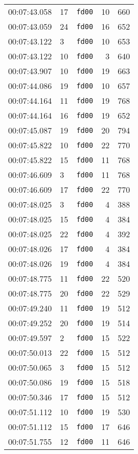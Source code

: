 \documentclass{article}
\begin{document}
\begin{longtable}{lllrr}
00:07:43.058 & 17 & \texttt{fd00} & 10 & 660 \\
00:07:43.059 & 24 & \texttt{fd00} & 16 & 652 \\
00:07:43.122 & 3 & \texttt{fd00} & 10 & 653 \\
00:07:43.122 & 10 & \texttt{fd00} & 3 & 640 \\
00:07:43.907 & 10 & \texttt{fd00} & 19 & 663 \\
00:07:44.086 & 19 & \texttt{fd00} & 10 & 657 \\
00:07:44.164 & 11 & \texttt{fd00} & 19 & 768 \\
00:07:44.164 & 16 & \texttt{fd00} & 19 & 652 \\
00:07:45.087 & 19 & \texttt{fd00} & 20 & 794 \\
00:07:45.822 & 10 & \texttt{fd00} & 22 & 770 \\
00:07:45.822 & 15 & \texttt{fd00} & 11 & 768 \\
00:07:46.609 & 3 & \texttt{fd00} & 11 & 768 \\
00:07:46.609 & 17 & \texttt{fd00} & 22 & 770 \\
00:07:48.025 & 3 & \texttt{fd00} & 4 & 388 \\
00:07:48.025 & 15 & \texttt{fd00} & 4 & 384 \\
00:07:48.025 & 22 & \texttt{fd00} & 4 & 392 \\
00:07:48.026 & 17 & \texttt{fd00} & 4 & 384 \\
00:07:48.026 & 19 & \texttt{fd00} & 4 & 384 \\
00:07:48.775 & 11 & \texttt{fd00} & 22 & 520 \\
00:07:48.775 & 20 & \texttt{fd00} & 22 & 529 \\
00:07:49.240 & 11 & \texttt{fd00} & 19 & 512 \\
00:07:49.252 & 20 & \texttt{fd00} & 19 & 514 \\
00:07:49.597 & 2 & \texttt{fd00} & 15 & 522 \\
00:07:50.013 & 22 & \texttt{fd00} & 15 & 512 \\
00:07:50.065 & 3 & \texttt{fd00} & 15 & 512 \\
00:07:50.086 & 19 & \texttt{fd00} & 15 & 518 \\
00:07:50.346 & 17 & \texttt{fd00} & 15 & 512 \\
00:07:51.112 & 10 & \texttt{fd00} & 19 & 530 \\
00:07:51.112 & 15 & \texttt{fd00} & 17 & 646 \\
00:07:51.755 & 12 & \texttt{fd00} & 11 & 646 \\

\end{longtable}
\end{document}
